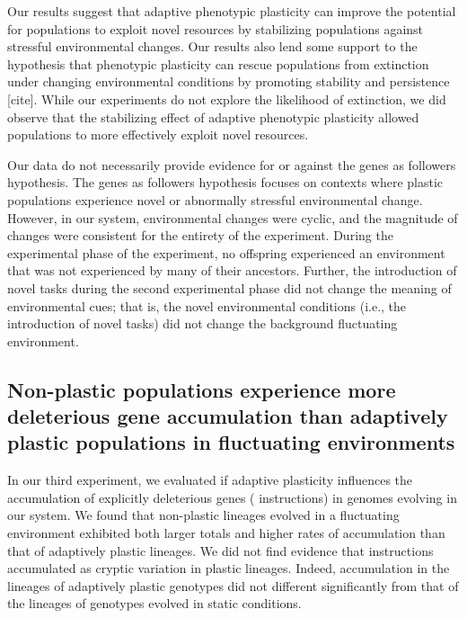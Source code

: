 Our results suggest that adaptive phenotypic plasticity can improve the potential for populations to exploit novel resources by stabilizing populations against stressful environmental changes.
Our results also lend some support to the hypothesis that phenotypic plasticity can rescue populations from extinction under changing environmental conditions by promoting stability and persistence [cite].
While our experiments do not explore the likelihood of extinction, we did observe that the stabilizing effect of adaptive phenotypic plasticity allowed populations to more effectively exploit novel resources.

Our data do not necessarily provide evidence for or against the genes as followers hypothesis.
The genes as followers hypothesis focuses on contexts where plastic populations experience novel or abnormally stressful environmental change.
However, in our system, environmental changes were cyclic, and the magnitude of changes were consistent for the entirety of the experiment.
During the experimental phase of the experiment, no offspring experienced an environment that was not experienced by many of their ancestors.
Further, the introduction of novel tasks during the second experimental phase did not change the meaning of environmental cues; that is, the novel environmental conditions (i.e., the introduction of novel tasks) did not change the background fluctuating environment.

\vspace{0.25cm}
\subsection{Non-plastic populations experience more deleterious gene accumulation than adaptively plastic populations in fluctuating environments}

In our third experiment, we evaluated if adaptive plasticity influences the accumulation of explicitly deleterious genes ( instructions) in genomes evolving in our system.
We found that non-plastic lineages evolved in a fluctuating environment exhibited both larger totals and higher rates of  accumulation than that of adaptively plastic lineages.
We did not find evidence that  instructions accumulated as cryptic variation in plastic lineages.
Indeed,  accumulation in the lineages of adaptively plastic genotypes did not different significantly from that of the lineages of genotypes evolved in static conditions.

